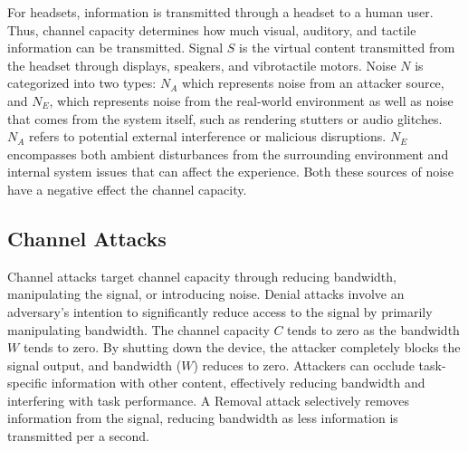 For \MR headsets, information is transmitted through a headset to a human user. 
Thus, channel capacity determines how much visual, auditory, and tactile information can be transmitted. 
Signal \({S}\) is the virtual content transmitted from the headset through displays, speakers, and vibrotactile motors. 
Noise \({N}\) is categorized into two types: \({N_A}\) which represents noise from an attacker source, and \({N_E}\), which represents noise from the real-world environment as well as noise that comes from the system itself, such as rendering stutters or audio glitches. 
\({N_A}\) refers to potential external interference or malicious disruptions.
\({N_E}\) encompasses both ambient disturbances from the surrounding environment and internal system issues that can affect the \MR experience. 
Both these sources of noise have a negative effect the channel capacity. %

\subsection{Channel Attacks}
Channel attacks target channel capacity through reducing bandwidth, manipulating the signal, or introducing noise.
Denial attacks involve an adversary's intention to significantly reduce access to the signal by primarily manipulating bandwidth. The channel capacity \({C}\) tends to zero as the bandwidth \({W}\) tends to zero. %
By shutting down the device, the attacker completely blocks the signal output, and bandwidth ($W$) reduces to zero. %
Attackers can occlude task-specific information with other content, effectively reducing bandwidth and interfering with task performance. 
A Removal attack selectively removes information from the signal, reducing bandwidth as less information is transmitted per a second. %

